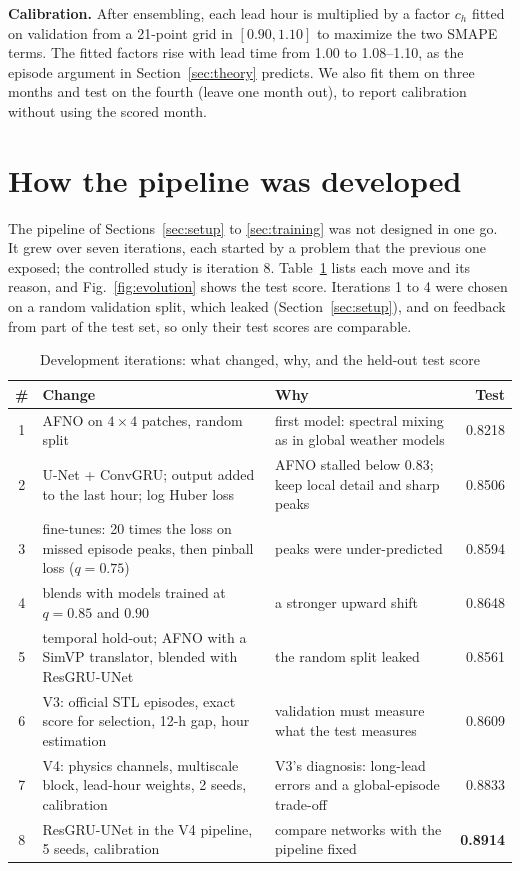 \documentclass[conference]{IEEEtran}
\begin{document}
\textbf{Calibration.} After ensembling, each lead hour is multiplied by a factor $c_h$ fitted on validation from a 21-point grid in $[0.90,1.10]$ to maximize the two SMAPE terms. The fitted factors rise with lead time from 1.00 to 1.08--1.10, as the episode argument in Section~\ref{sec:theory} predicts. We also fit them on three months and test on the fourth (leave one month out), to report calibration without using the scored month.

\section{How the pipeline was developed}
\label{sec:history}
The pipeline of Sections~\ref{sec:setup} to \ref{sec:training} was not designed in one go. It grew over seven iterations, each started by a problem that the previous one exposed; the controlled study is iteration 8. Table~\ref{tab:iterations} lists each move and its reason, and Fig.~\ref{fig:evolution} shows the test score. Iterations 1 to 4 were chosen on a random validation split, which leaked (Section~\ref{sec:setup}), and on feedback from part of the test set, so only their test scores are comparable.

\begin{table}[!t]
\centering
\caption{Development iterations: what changed, why, and the held-out test score}
\label{tab:iterations}
\begin{tabular}{@{}c>{\raggedright\arraybackslash}p{}>{\raggedright\arraybackslash}p{}r@{}}
\toprule
\# & Change & Why & Test \\
\midrule
1 & AFNO on $4\times4$ patches, random split & first model: spectral mixing as in global weather models \cite{pathak2022fourcastnet} & 0.8218 \\
2 & U-Net + ConvGRU; output added to the last hour; log Huber loss & AFNO stalled below 0.83; keep local detail and sharp peaks & 0.8506 \\
3 & fine-tunes: 20 times the loss on missed episode peaks, then pinball loss ($q=0.75$) & peaks were under-predicted & 0.8594 \\
4 & blends with models trained at $q=0.85$ and $0.90$ & a stronger upward shift & 0.8648 \\
5 & temporal hold-out; AFNO with a SimVP translator, blended with ResGRU-UNet & the random split leaked & 0.8561 \\
6 & V3: official STL episodes, exact score for selection, 12-h gap, hour estimation & validation must measure what the test measures & 0.8609 \\
7 & V4: physics channels, multiscale block, lead-hour weights, 2 seeds, calibration & V3's diagnosis: long-lead errors and a global-episode trade-off & 0.8833 \\
8 & ResGRU-UNet in the V4 pipeline, 5 seeds, calibration & compare networks with the pipeline fixed & \textbf{0.8914} \\
\bottomrule
\end{tabular}
\end{table}
\end{document}
